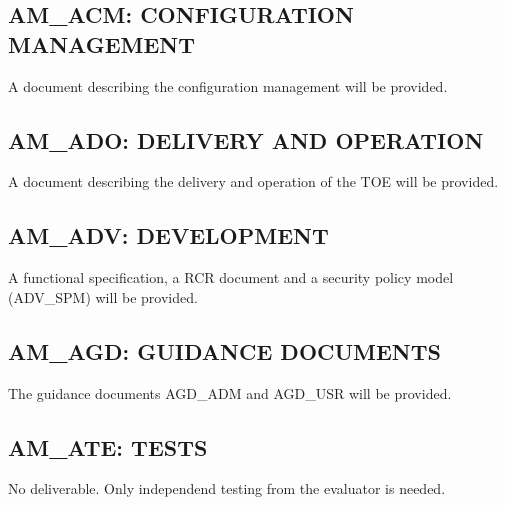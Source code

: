 \documentclass[12pt,english]{scrbook}
\begin{document}



\subsection{AM{\_}ACM: CONFIGURATION MANAGEMENT}

A document describing the configuration management will be provided.





\subsection{AM{\_}ADO: DELIVERY AND OPERATION}

A document describing the delivery and operation of the TOE will be provided.




\subsection{AM{\_}ADV: DEVELOPMENT}

A functional specification,  a RCR document and a security policy model
(ADV\_SPM) will be provided.




\subsection{AM{\_}AGD: GUIDANCE DOCUMENTS}

The guidance documents AGD{\_}ADM and AGD{\_}USR will be provided.





\subsection{AM{\_}ATE: TESTS}

No deliverable. Only independend testing from the evaluator is needed.


\end{document}

